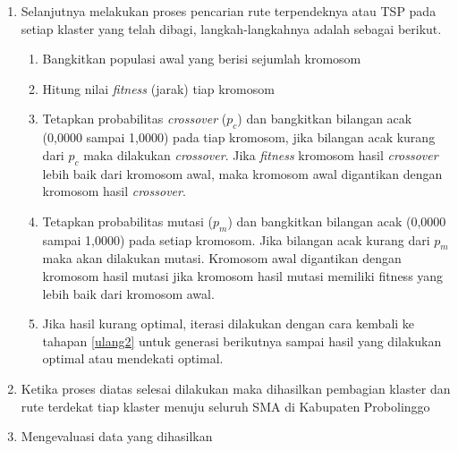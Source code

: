 \begin{enumerate}
	\item Selanjutnya melakukan proses pencarian rute terpendeknya atau TSP pada setiap klaster yang telah dibagi, langkah-langkahnya adalah sebagai berikut.
	\begin{enumerate}
		\item Bangkitkan populasi awal yang berisi sejumlah kromosom
	    \item \label{ulang2} Hitung nilai \textit{fitness} (jarak) tiap kromosom
	    \item Tetapkan probabilitas \textit{crossover} ($p_c$) dan bangkitkan bilangan acak (0,0000 sampai 1,0000) pada tiap kromosom, jika bilangan acak kurang dari $p_c$ maka dilakukan \textit{crossover}. Jika \textit{fitness} kromosom hasil \textit{crossover} lebih baik dari kromosom awal, maka kromosom awal digantikan dengan kromosom hasil \textit{crossover}.
	    \item Tetapkan probabilitas mutasi ($p_m$) dan bangkitkan bilangan acak (0,0000 sampai 1,0000) pada setiap kromosom. Jika bilangan acak kurang dari $p_m$ maka akan dilakukan mutasi. Kromosom awal digantikan dengan kromosom hasil mutasi jika kromosom hasil mutasi memiliki fitness yang lebih baik dari kromosom awal.
	    \item Jika hasil kurang optimal, iterasi dilakukan dengan cara kembali ke tahapan \ref{ulang2} untuk generasi berikutnya sampai hasil yang dilakukan optimal atau mendekati optimal.
    \end{enumerate}
	\item Ketika proses diatas selesai dilakukan maka dihasilkan pembagian klaster dan rute terdekat tiap klaster menuju seluruh SMA di Kabupaten Probolinggo
	\item Mengevaluasi data yang dihasilkan
\end{enumerate}
